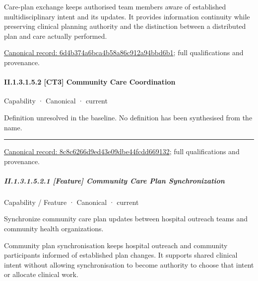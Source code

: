 Care-plan exchange keeps authorised team members aware of established multidisciplinary intent and its updates. It provides information continuity while preserving clinical planning authority and the distinction between a distributed plan and care actually performed.


{\footnotesize \href{../../../../continuum/strategy/capability/feature/6d4b374a6bca4b58a86c912a94bbd6b1.md}{Canonical record: 6d4b374a6bca4b58a86c912a94bbd6b1}; full qualifications and provenance.}\par
\paragraph*{II.1.3.1.5.2 [CT3] Community Care Coordination}
\label{navigation:II.1.3.1.5.2}

\label{element:8c8c6266d9ed43e09dbe44fcdd669132}
{\small Capability · Canonical · current}\par

Definition unresolved in the baseline. No definition has been synthesised from the name.



\medskip\hrule\medskip

{\footnotesize \href{../../../../continuum/strategy/capability/8c8c6266d9ed43e09dbe44fcdd669132.md}{Canonical record: 8c8c6266d9ed43e09dbe44fcdd669132}; full qualifications and provenance.}\par
\subparagraph*{II.1.3.1.5.2.1 [Feature] Community Care Plan Synchronization}
\label{navigation:II.1.3.1.5.2.1}

\label{element:30a0a2a6f1044d9ca9337b655f303e24}
{\small Capability / Feature · Canonical · current}\par

Synchronize community care plan updates between hospital outreach teams and community health organizations.



Community plan synchronisation keeps hospital outreach and community participants informed of established plan changes. It supports shared clinical intent without allowing synchronisation to become authority to choose that intent or allocate clinical work.



